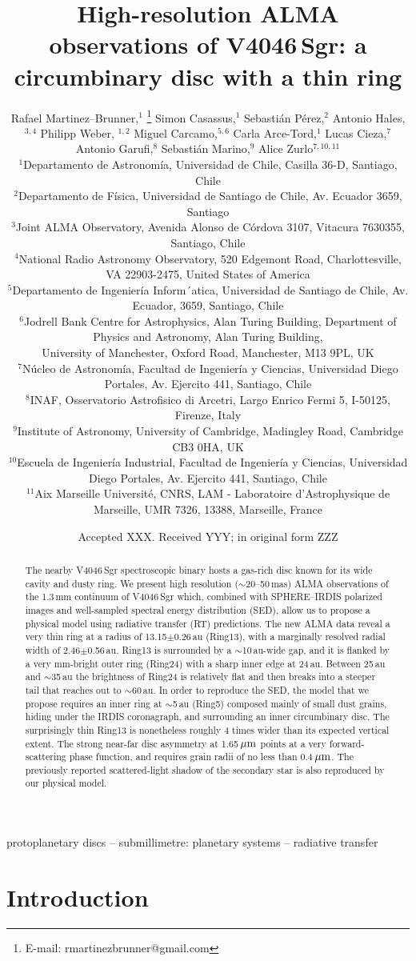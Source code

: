 \documentclass[fleqn,usenatbib,useAMS]{mnras}
\title[High-resolution ALMA observations of V4046\,Sgr]{High-resolution ALMA observations of V4046\,Sgr: a circumbinary disc with a thin ring}
\author[R. Martinez Brunner et al.]{Rafael Martinez--Brunner,$^{1}$
\thanks{E-mail: rmartinezbrunner@gmail.com}
Simon Casassus,$^{1}$
Sebasti\'an P\'erez,$^{2}$
Antonio Hales,$^{3,4}$
Philipp Weber, $^{1,2}$ \newauthor
Miguel Carcamo,$^{5,6}$
Carla Arce-Tord,$^{1}$
Lucas Cieza,$^{7}$
Antonio Garufi,$^{8}$
Sebasti\'an Marino,$^{9}$
Alice Zurlo$^{7,10,11}$
\\
$^{1}$Departamento de Astronom\'ia, Universidad de Chile, Casilla 36-D, Santiago, Chile\\
$^{2}$Departamento de F\'isica, Universidad de Santiago de Chile, Av. Ecuador 3659, Santiago\\
$^{3}$Joint ALMA Observatory, Avenida Alonso de C\'ordova 3107, Vitacura 7630355, Santiago, Chile \\
$^{4}$National Radio Astronomy Observatory, 520 Edgemont Road, Charlottesville, VA 22903-2475, United States of America \\
$^{5}$Departamento de Ingenier\'ia Inform´atica, Universidad de Santiago de Chile, Av. Ecuador, 3659, Santiago, Chile\\
$^{6}$Jodrell Bank Centre for Astrophysics, Alan Turing Building, Department of Physics and Astronomy, Alan Turing Building,\\ University of Manchester, Oxford Road, Manchester, M13 9PL, UK \\
$^{7}$N\'ucleo de Astronom\'ia, Facultad de Ingenier\'ia y Ciencias, Universidad Diego Portales, Av. Ejercito 441, Santiago, Chile\\
$^{8}$INAF, Osservatorio Astrofisico di Arcetri, Largo Enrico Fermi 5, I-50125, Firenze, Italy\\
$^{9}$Institute of Astronomy, University of Cambridge, Madingley Road, Cambridge CB3 0HA, UK\\
$^{10}$Escuela de Ingenier\'ia Industrial, Facultad de Ingenier\'ia y Ciencias, Universidad Diego Portales, Av. Ejercito 441, Santiago, Chile \\
$^{11}$Aix Marseille Universit\'e, CNRS, LAM - Laboratoire d'Astrophysique de Marseille, UMR 7326, 13388, Marseille, France  \\
}
\date{Accepted XXX. Received YYY; in original form ZZZ}
\begin{document}
\label{firstpage}
\pagerange{\pageref{firstpage}--\pageref{lastpage}}
\maketitle

\begin{abstract}
    The nearby V4046\,Sgr spectroscopic binary hosts a gas-rich disc known for its wide cavity and dusty ring. We present high resolution ($\sim$20--50\,mas) ALMA observations of the 1.3\,mm continuum of V4046\,Sgr which, combined with SPHERE--IRDIS polarized images and well-sampled spectral energy distribution (SED), allow us to propose a physical model using radiative transfer (RT) predictions. The new ALMA data reveal a very thin ring at a radius of 13.15$\pm$0.26\,au (Ring13), with a marginally resolved radial width of 2.46$\pm$0.56\,au. Ring13 is surrounded by a $\sim$10\,au-wide gap, and it is flanked by a very mm-bright outer ring (Ring24) with a sharp inner edge at 24\,au. Between 25\,au and $\sim$35\,au the brightness of Ring24 is relatively flat and then breaks into a steeper tail that reaches out to $\sim$60\,au. In order to reproduce the SED, the model that we propose requires an inner ring at $\sim$5\,au (Ring5) composed mainly of small dust grains, hiding under the IRDIS coronagraph, and surrounding an inner circumbinary disc. The surprisingly thin Ring13 is nonetheless roughly 4 times wider than its expected vertical extent. The strong near-far disc asymmetry at 1.65\,$\hbox{$\mu$m}$ points at a very forward-scattering phase function, and requires grain radii of no less than 0.4\,$\hbox{$\mu$m}$. The previously reported scattered-light shadow of the secondary star is also reproduced by our physical model.
\end{abstract}

\begin{keywords}
 protoplanetary discs -- submillimetre: planetary systems -- radiative transfer
\end{keywords}



\section{Introduction} \label{sec:Introduction}
\end{document}
